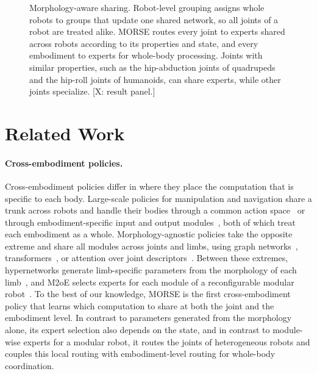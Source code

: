 \begin{figure}[t]
\centering
\fbox{\rule{0pt}{1.4in}\rule{0.95\linewidth}{0pt}}
\caption{Morphology-aware sharing. Robot-level grouping assigns whole robots to groups that update one shared network,
so all joints of a robot are treated alike. MORSE routes every joint to experts shared across robots according to its
properties and state, and every embodiment to experts for whole-body processing. Joints with similar properties, such
as the hip-abduction joints of quadrupeds and the hip-roll joints of humanoids, can share experts, while other joints
specialize. [X: result panel.]}
\label{fig:teaser}
\end{figure}

\section{Related Work}
\label{sec:related}

\paragraph{Cross-embodiment policies.}
Cross-embodiment policies differ in where they place the computation that is specific to each body. Large-scale
policies for manipulation and navigation share a trunk across robots and handle their bodies through a common action
space~\citep{oxe2024,black2024pi0} or through embodiment-specific input and output
modules~\citep{octo2024,doshi2024crossformer,wang2024hpt}, both of which treat each embodiment as a whole.
Morphology-agnostic policies take the opposite extreme and share all modules across joints and limbs, using graph
networks~\citep{wang2018nervenet,pathak2019dgn,huang2020smp},
transformers~\citep{kurin2021amorpheus,gupta2022metamorph,trabucco2022anymorph,sferrazza2024bot}, or attention over
joint descriptors~\citep{bohlinger2024onepolicy,ai2025embodimentscaling}. Between these extremes, hypernetworks
generate limb-specific parameters from the morphology of each limb~\citep{xiong2023modumorph,xiong2024hyperdistill},
and M2oE selects experts for each module of a reconfigurable modular robot~\citep{liu2026m2oe}.
To the best of our knowledge, MORSE is the first cross-embodiment policy that learns which computation to share at
both the joint and the embodiment level. In contrast to parameters generated from the morphology alone, its expert
selection also depends on the state, and in contrast to module-wise experts for a modular robot, it routes the joints
of heterogeneous robots and couples this local routing with embodiment-level routing for whole-body coordination.

